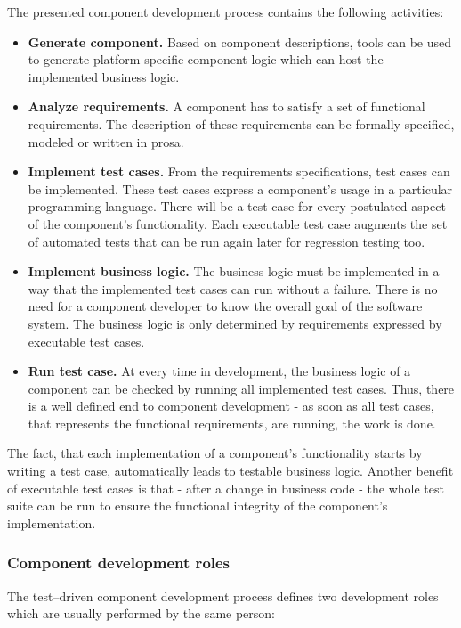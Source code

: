\newpage
\noindent
The presented component development process contains the following activities: 
\begin{itemize}
\item {\bf Generate component.}
Based on component descriptions, tools can be used to 
generate platform specific component logic which can host the implemented 
business logic.

\item {\bf Analyze requirements.}
A component has to satisfy a set of functional requirements. The description 
of these requirements can be formally specified, modeled or written in prosa.

\item {\bf Implement test cases.}
From the requirements specifications, test cases can be implemented. 
These test cases express a component's usage in a particular programming 
language.
There will be a test case for every postulated aspect of the component's 
functionality.
Each executable test case augments the set of automated tests that can be
run again later for regression testing too.

\item {\bf Implement business logic.}
The business logic must be implemented in a way that the implemented test cases
can run without a failure. 
There is no need for a component developer to know the overall goal of the 
software system. 
The business logic is only determined by requirements expressed by executable
test cases.

\item {\bf Run test case.}
At every time in development, the business logic of a component can be checked
by running all implemented test cases.
Thus, there is a well defined end to component development - as soon as all 
test cases, that represents the functional requirements, are
running, the work is done.
\end{itemize}

\noindent
The fact, that each implementation of a component's functionality starts by 
writing a test case, automatically leads to testable business logic.
Another benefit of executable test cases is that - after a change in 
business code - the whole test suite can be run to ensure the functional 
integrity of the component's implementation. 


\subsubsection{Component development roles}
The test--driven component development process defines two development roles 
which are usually performed by the same person:

